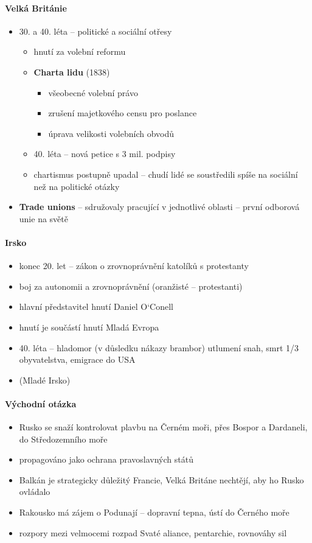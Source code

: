 \paragraph{Velká Británie}
\begin{itemize}
\item 30. a 40. léta -- politické a sociální otřesy
	\begin{itemize}
	\item hnutí za volební reformu
	\item \textbf{Charta lidu} (1838)
		\begin{itemize}
		\item všeobecné volební právo
		\item zrušení majetkového censu pro poslance
		\item úprava velikosti volebních obvodů
		\end{itemize}
	\item 40. léta -- nová petice s 3 mil. podpisy
	\item chartismus postupně upadal -- chudí lidé se soustředili spíše na sociální než na politické otázky
	\end{itemize}
\item \textbf{Trade unions} -- sdružovaly pracující v jednotlivé oblasti -- první odborová unie na světě
\end{itemize}

\paragraph{Irsko}
\begin{itemize}
\item konec 20. let -- zákon o zrovnoprávnění katolíků s protestanty
\item boj za autonomii a zrovnoprávnění (oranžisté -- protestanti)
\item hlavní představitel hnutí Daniel O`Conell 
\item hnutí je součástí hnutí Mladá Evropa
\item 40. léta -- hladomor (v důsledku nákazy brambor) \ra utlumení snah, smrt 1/3 obyvatelstva, emigrace do USA
\item {} (Mladé Irsko)
\end{itemize}

\paragraph{Východní otázka}
\begin{itemize}
\item Rusko se snaží kontrolovat plavbu na Černém moři, přes Bospor a Dardaneli, do Středozemního moře
\item propagováno jako ochrana pravoslavných států
\item Balkán je strategicky důležitý \ra Francie, Velká Británe nechtějí, aby ho Rusko ovládalo
\item Rakousko má zájem o Podunají -- dopravní tepna, ústí do Černého moře
\item[\ra] rozpory mezi velmocemi \ra rozpad Svaté aliance, pentarchie, rovnováhy sil
\end{itemize}

